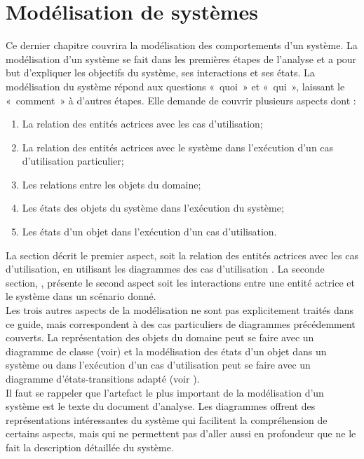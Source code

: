 \chapter{Modélisation de systèmes}

Ce dernier chapitre couvrira la modélisation des comportements d'un système. La modélisation d'un système se fait dans les premières étapes de l'analyse et a pour but d'expliquer les objectifs du système, ses interactions et ses états. La modélisation du système répond aux questions «~quoi~» et «~qui~», laissant le «~comment~» à d'autres étapes. Elle demande de couvrir plusieurs aspects dont :

\begin{enumerate}
	\item La relation des entités actrices avec les cas d'utilisation;
	\item La relation des entités actrices avec le système dans l'exécution d'un cas d'utilisation particulier;
	\item Les relations entre les objets du domaine;
	\item Les états des objets du système dans l'exécution du système;
	\item Les états d'un objet dans l'exécution d'un cas d'utilisation.
\end{enumerate} 

La section  décrit le premier aspect, soit la relation des entités actrices  avec les cas d'utilisation, en utilisant les diagrammes des cas d'utilisation . La seconde section, , présente le second aspect soit les  interactions entre une entité actrice et le système dans un scénario donné. \\

Les trois autres aspects de la modélisation ne sont pas explicitement traités dans ce guide, mais correspondent à des cas particuliers de diagrammes précédemment couverts. La représentation des objets du domaine peut se faire avec un diagramme de classe (voir) et la modélisation des états d'un objet dans un système ou dans l'exécution d'un cas d'utilisation peut se faire avec un diagramme d'états-transitions adapté (voir ).\\

Il faut se rappeler que l'\gls{artefact} le plus important de la modélisation d'un système est le texte du document d'analyse. Les diagrammes offrent des représentations intéressantes du système qui facilitent la compréhension de certains aspects, mais qui ne permettent pas d'aller aussi en profondeur que ne le fait la description détaillée du système.

